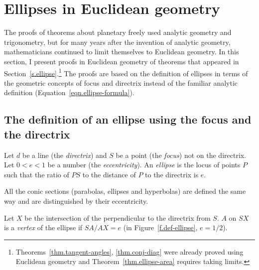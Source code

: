 
\section{Ellipses in Euclidean geometry}\label{s.geometry}

The proofs of theorems about planetary freely used analytic geometry and trigonometry, but for many years after the invention of analytic geometry, mathematicians continued to limit themselves to Euclidean geometry. In this section, I present proofs in Euclidean geometry of theorems that appeared in Section~\ref{s.ellipse}.\footnote{Theorems~\ref{thm.tangent-angles}, \ref{thm.conj-diag} were already proved using Euclidean geometry and Theorem~\ref{thm.ellipse-area} requires taking limits.} The proofs are based on the definition of ellipses in terms of the geometric concepts of focus and directrix instead of the familiar analytic definition (Equation~\ref{eqn.ellipse-formula}).


\subsection{The definition of an ellipse using the focus and the directrix}

\begin{definition}\label{def.ellipse}
Let $d$ be a line (the \emph{directrix}) and $S$ be a point (the \emph{focus}) not on the directrix. Let $0<e<1$ be a number (the \emph{eccentricity}). An \emph{ellipse} is the locus of points $P$ such that the ratio of  $PS$ to the distance of $P$ to the directrix is $e$.
\end{definition}

All the conic sections (parabolas, ellipses and hyperbolas) are defined the same way and are distinguished by their eccentricity.
\begin{definition}
Let $X$ be the intersection of the perpendicular to the directrix from $S$. $A$ on $SX$ is a \emph{vertex} of the ellipse if $SA/AX=e$ (in Figure~\ref{f.def-ellipse}, $e=1/2$).
\end{definition}


